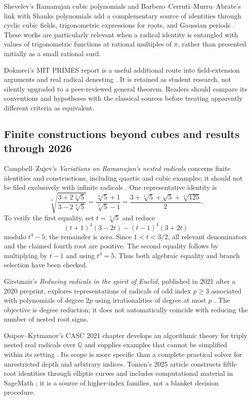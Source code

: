 \documentclass[11pt,a4paper]{article}
\numberwithin{equation}{section}
\theoremstyle{definition}\newtheorem{definition}[theorem]{Definition}
\theoremstyle{remark}\newtheorem{remark}[theorem]{Remark}
\newcommand{\Q}{\mathbb Q}\newcommand{\R}{\mathbb R}\newcommand{\C}{\mathbb C}\newcommand{\Z}{\mathbb Z}
\begin{document}
Shevelev's Ramanujan cubic polynomials and Barbero--Cerruti--Murru--Abrate's link with Shanks polynomials add a complementary source of identities through cyclic cubic fields, trigonometric expressions for roots, and Gaussian periods \cite{shevelev,barbero}. These works are particularly relevant when a radical identity is entangled with values of trigonometric functions at rational multiples of $\pi$, rather than presented initially as a small rational surd.

Dokmeci's MIT PRIMES report is a useful additional route into field-extension arguments and real radical denesting \cite{dokmeci}. It is retained as student research, not silently upgraded to a peer-reviewed general theorem. Readers should compare its conventions and hypotheses with the classical sources before treating apparently different criteria as equivalent.

\subsection{Finite constructions beyond cubes and results through 2026}
Campbell--Zujev's \emph{Variations on Ramanujan's nested radicals} concerns finite identities and constructions, including quartic and cubic examples; it should not be filed exclusively with infinite radicals \cite{campbell}. One representative identity is
\begin{equation}\label{eq:quartic-quotient}
\sqrt[4]{\frac{3+2\sqrt[4]5}{3-2\sqrt[4]5}}
=\frac{\sqrt[4]5+1}{\sqrt[4]5-1}
=\frac{3+\sqrt[4]5+\sqrt5+\sqrt[4]{125}}2.
\end{equation}
To verify the first equality, set $t=\sqrt[4]5$ and reduce
\[
(t+1)^4(3-2t)-(t-1)^4(3+2t)
\]
modulo $t^4-5$; the remainder is zero. Since $1<t<3/2$, all relevant denominators and the claimed fourth root are positive. The second equality follows by multiplying by $t-1$ and using $t^4=5$. Thus both algebraic equality and branch selection have been checked.

Girstmair's \emph{Reducing radicals in the spirit of Euclid}, published in 2021 after a 2020 preprint, explores representations of radicals of odd index $p\ge3$ associated with polynomials of degree $2p$ using irrationalities of degree at most $p$ \cite{girstmair}. The objective is degree reduction; it does not automatically coincide with reducing the number of nested root signs.

Osipov--Kytmanov's CASC 2021 chapter develops an algorithmic theory for triply nested real radicals over $\Q$ and supplies examples that cannot be simplified within its setting \cite{osipov21}. Its scope is more specific than a complete practical solver for unrestricted depth and arbitrary indices. Tonien's 2025 article constructs fifth-root identities through elliptic curves and includes computational material in SageMath \cite{tonien}; it is a source of higher-index families, not a blanket decision procedure.
\end{document}

